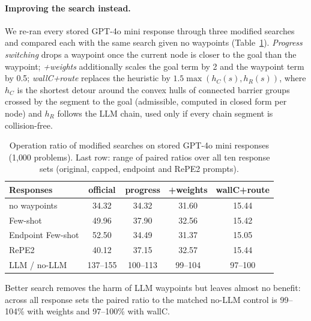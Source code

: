 \documentclass[11pt]{article}
\begin{document}
\paragraph{Improving the search instead.}
We re-ran every stored GPT-4o mini response through three modified searches and compared each with the same search given no waypoints (Table~\ref{tab:post}).
\emph{Progress switching} drops a waypoint once the current node is closer to the goal than the waypoint;
\emph{+weights} additionally scales the goal term by 2 and the waypoint term by 0.5;
\emph{wallC+route} replaces the heuristic by $1.5\max(h_{C}(s), h_{R}(s))$, where $h_{C}$ is the shortest detour around the convex hulls of connected barrier groups crossed by the segment to the goal (admissible, computed in closed form per node) and $h_{R}$ follows the LLM chain, used only if every chain segment is collision-free.

\begin{table}[t]
\centering\small
\setlength{\tabcolsep}{2.6pt}
\begin{tabular}{lcccc}
\toprule
Responses & official & progress & +weights & wallC+route \\
\midrule
no waypoints & 34.32 & 34.32 & 31.60 & 15.44 \\
Few-shot & 49.96 & 37.90 & 32.56 & 15.42 \\
Endpoint Few-shot & 52.50 & 34.49 & 31.37 & 15.05 \\
RePE2 & 40.12 & 37.15 & 32.57 & 15.44 \\
\midrule
LLM / no-LLM & 137--155 & 100--113 & 99--104 & 97--100 \\
\bottomrule
\end{tabular}
\caption{Operation ratio of modified searches on stored GPT-4o mini responses (1{,}000 problems). Last row: range of paired ratios over all ten response sets (original, capped, endpoint and RePE2 prompts).}
\label{tab:post}
\end{table}

Better search removes the harm of LLM waypoints but leaves almost no benefit: across all response sets the paired ratio to the matched no-LLM control is 99--104\% with weights and 97--100\% with wallC.
\end{document}
